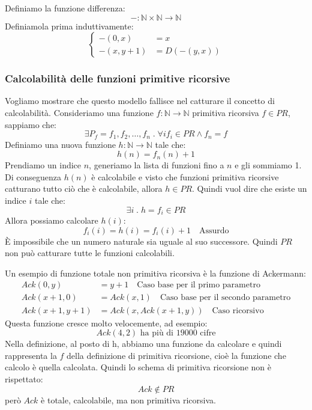 \documentclass[a4paper]{article}
\begin{document}
\begin{exercise}[Differenza]
  Definiamo la funzione differenza:
  \[
    -: \mathbb{N} \times \mathbb{N} \to \mathbb{N}
  \] 
  Definiamola prima induttivamente:
  \[
    \begin{cases}
      -(0, x) &= x \\
      -(x, y+1) &= D(-(y, x))
    \end{cases}
  \] 
\end{exercise}

\subsubsection{Calcolabilità delle funzioni primitive ricorsive}
Vogliamo mostrare che questo modello fallisce nel catturare il concetto di calcolabilità.
Consideriamo una funzione \( f: \mathbb{N} \to  \mathbb{N} \) primitiva ricorsiva
\( f \in PR \), sappiamo che:
\[
  \exists P_f = f_1, f_2, \ldots, f_n \;.\; \forall i f_i \in PR \wedge f_n = f
\] 
Definiamo una nuova funzione \( h : \mathbb{N} \to  \mathbb{N} \) tale che:
\[
  h(n) = f_n(n) + 1
\] 
Prendiamo un indice \( n \), generiamo la lista di funzioni fino a \( n \) e gli sommiamo
1. Di conseguenza \( h(n) \) è calcolabile e visto che funzioni primitiva ricorsive catturano
tutto ciò che è calcolabile, allora \( h \in PR \). Quindi vuol dire che esiste un
indice \( i \) tale che:
\[
  \exists i \;.\; h = f_i \in PR
\] 
Allora possiamo calcolare \( h(i) \):
\[
  f_i(i) = h(i) = f_i(i) + 1 \quad \text{Assurdo}
\] 
È impossibile che un numero naturale sia uguale al suo successore. Quindi \( PR \) non
può catturare tutte le funzioni calcolabili.

\begin{example}
  Un esempio di funzione totale non primitiva ricorsiva è la funzione di Ackermann:
  \[
    \begin{aligned}
      Ack(0, y) &= y + 1 \quad \text{Caso base per il primo parametro} \\
      Ack(x+1, 0) &= Ack(x, 1) \quad \text{Caso base per il secondo parametro}\\
      Ack(x+1, y+1) &= Ack(x, Ack(x+1, y)) \quad \text{Caso ricorsivo}
    \end{aligned}
  \] 
  Questa funzione cresce molto velocemente, ad esempio:
  \[
    Ack(4, 2) \text{ ha più di 19000 cifre}
  \] 
  Nella definizione, al posto di h, abbiamo una funzione da calcolare e quindi rappresenta
  la \( f \) della definizione di primitiva ricorsione, cioè la funzione che calcolo
  è quella calcolata. Quindi lo schema di primitiva ricorsione non è rispettato:
  \[
    Ack \notin PR
  \] 
  però \( Ack \) è totale, calcolabile, ma non primitiva ricorsiva.
\end{example}
\end{document}
